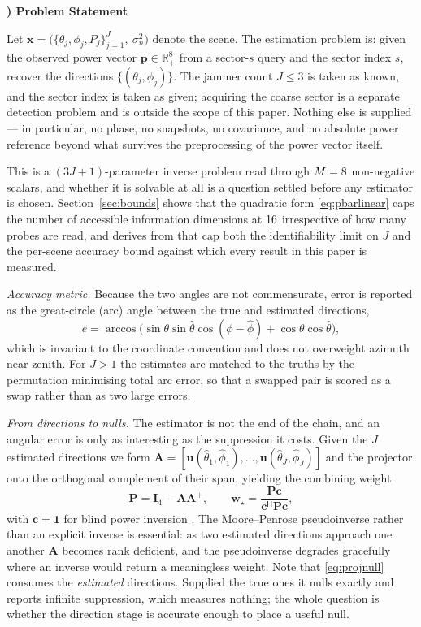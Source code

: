\documentclass[journal]{IEEEtran}
\newcommand{\uv}{\mathbf{u}}
\newcommand{\wv}{\mathbf{w}}
\newcommand{\pv}{\mathbf{p}}
\newcommand{\Herm}{\mathsf{H}}
\newcounter{modelpart}[subsection]
\newcommand{\modelpart}[1]{%
  \par\medskip\refstepcounter{modelpart}%
  \noindent\textbf{\arabic{modelpart}) #1}\par\smallskip\noindent\ignorespaces}
\begin{document}
\modelpart{Problem Statement}
\label{sec:model:problem}

Let $\mathbf{x} = \big(\{\theta_j, \phi_j, P_j\}_{j=1}^{J},\ \sigma_n^2\big)$
denote the scene. The estimation problem is: given the observed power vector
$\pv \in \mathbb{R}_{+}^{8}$ from a sector-$s$ query and the sector index $s$,
recover the directions $\{(\theta_j,\phi_j)\}$. The jammer count $J \le 3$ is
taken as known, and the sector index is taken as given; acquiring the coarse
sector is a separate detection problem and is outside the scope of this paper.
Nothing else is supplied --- in particular, no phase, no snapshots, no
covariance, and no absolute power reference beyond what survives the
preprocessing of the power vector itself.

This is a $(3J+1)$-parameter inverse problem read through $M = 8$
non-negative scalars, and whether it is solvable at all is a question settled
before any estimator is chosen. Section~\ref{sec:bounds} shows that the
quadratic form \eqref{eq:pbarlinear} caps the number of accessible information
dimensions at $16$ irrespective of how many probes are read, and derives
from that cap both the identifiability limit on $J$ and the per-scene accuracy
bound against which every result in this paper is measured.

\emph{Accuracy metric.} Because the two angles are not commensurate, error is
reported as the great-circle (arc) angle between the true and estimated
directions,
\begin{equation}
e = \arccos\!\big(
\sin\theta\sin\hat\theta\cos(\phi - \hat\phi) + \cos\theta\cos\hat\theta
\big),
\label{eq:arcerr}
\end{equation}
which is invariant to the coordinate convention and does not overweight
azimuth near zenith. For $J > 1$ the estimates are matched to the truths by
the permutation minimising total arc error, so that a swapped pair is scored as
a swap rather than as two large errors.

\emph{From directions to nulls.} The estimator is not the end of the chain, and
an angular error is only as interesting as the suppression it costs. Given the
$J$ estimated directions we form
$\mathbf{A} = [\uv(\hat\theta_1,\hat\phi_1), \dots,
\uv(\hat\theta_J,\hat\phi_J)]$ and the projector onto the orthogonal
complement of their span, yielding the combining weight
\begin{equation}
\mathbf{P} = \mathbf{I}_4 - \mathbf{A}\mathbf{A}^{+},
\qquad
\wv_{\star} = \frac{\mathbf{P}\mathbf{c}}
                   {\mathbf{c}^{\Herm}\mathbf{P}\mathbf{c}} ,
\label{eq:projnull}
\end{equation}
with $\mathbf{c} = \mathbf{1}$ for blind power inversion \cite{compton1979}.
The Moore--Penrose pseudoinverse rather than an explicit inverse is essential:
as two estimated directions approach one another $\mathbf{A}$ becomes rank
deficient, and the pseudoinverse degrades gracefully where an inverse would
return a meaningless weight. Note that \eqref{eq:projnull} consumes the
\emph{estimated} directions. Supplied the true ones it nulls exactly and
reports infinite suppression, which measures nothing; the whole question is
whether the direction stage is accurate enough to place a useful null.
\end{document}
